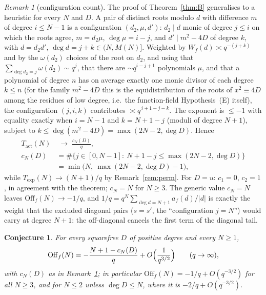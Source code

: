 \documentclass[11pt,a4paper]{article}
\newtheorem{conjecture}[theorem]{Conjecture}
\theoremstyle{remark}\newtheorem{remark}[theorem]{Remark}
\newcommand{\Off}{\mathrm{Off}}\newcommand{\e}{\mathrm{e}}
\begin{document}
\begin{remark}[configuration count]\label{rem:config}
The proof of Theorem~\ref{thm:B} generalises to a heuristic for every $N$ and $D$. A pair of distinct roots
modulo $d$ with difference $m$ of degree $i\le N-1$ is a configuration $(d_2,\mu,d')$: $d_2\mid d$ monic of degree
$j\le i$ on which the roots agree, $m=d_2\mu$, $\deg\mu=i-j$, and $d'\mid m^2-4D$ of degree $k$, with $d=d_2d'$,
$\deg d=j+k\in(N,M(N)]$. Weighted by $W_f(d)\asymp q^{-(j+k)}$ and by the $\omega(d_2)$ choices of the root on $d_2$,
and using that $\sum_{\deg d_2=j}\omega(d_2)\sim q^j$, that there are $\sim q^{i-j+1}$ polynomials $\mu$, and that a
polynomial of degree $n$ has on average exactly one monic divisor of each degree $k\le n$ (for the family
$m^2-4D$ this is the equidistribution of the roots of $x^2\equiv4D$ among the residues of low degree, i.e.\ the
function-field Hypothesis~(E) itself), the configuration $(j,i,k)$ contributes $\asymp q^{\,i+1-j-k}$. The exponent
is $\le-1$ with equality exactly when $i=N-1$ and $k=N+1-j$ (moduli of degree $N+1$), subject to
$k\le\deg(m^2-4D)=\max(2N-2,\deg D)$. Hence
\[
\begin{aligned}
T_{\mathrm{act}}(N)&\;\to\;\frac{c_N(D)}q,\\
c_N(D)&=\#\{j\in[0,N-1]:\ N+1-j\le\max(2N-2,\deg D)\}\\&=\min\bigl(N,\ \max(2N-2,\deg D)-1\bigr),
\end{aligned}
\]
while $T_{\exp}(N)\to(N+1)/q$ by Remark~\ref{rem:perm}. For $D=u$: $c_1=0$, $c_2=1$, in agreement with the theorem;
$c_N=N$ for $N\ge3$. The generic value $c_N=N$ leaves $\Off_f(N)\to-1/q$, and $1/q=q^N\sum_{\deg d=N+1}a_f(d)/|d|$ is
exactly the weight that the excluded diagonal pairs ($s=s'$, the ``configuration $j=N$'') would carry at degree
$N+1$: the off-diagonal cancels the first term of the diagonal tail.
\end{remark}

\begin{conjecture}\label{conj:kappa}
For every squarefree $D$ of positive degree and every $N\ge1$,
\[
\Off_f(N)=-\frac{N+1-c_N(D)}q+O\Bigl(\frac1{q^{3/2}}\Bigr)\qquad(q\to\infty),
\]
with $c_N(D)$ as in Remark~\ref{rem:config}; in particular $\Off_f(N)=-1/q+O(q^{-3/2})$ for all $N\ge3$, and for
$N\le2$ unless $\deg D\le N$, where it is $-2/q+O(q^{-3/2})$.
\end{conjecture}
\end{document}
